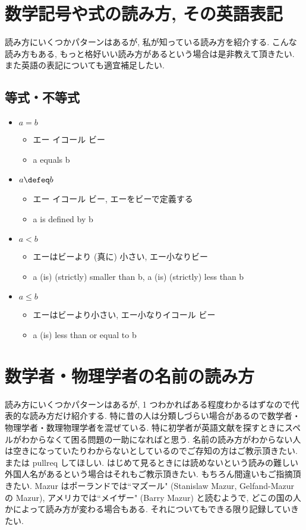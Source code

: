 \documentclass[openany, a4paper, oneside]{jsbook}
\begin{document}
\twocolumn
\chapter{数学記号や式の読み方, その英語表記}

読み方にいくつかパターンはあるが, 私が知っている読み方を紹介する.
こんな読み方もある, もっと格好いい読み方があるという場合は是非教えて頂きたい.
また英語の表記についても適宜補足したい.
\section{等式・不等式}

\begin{itemize}
\item $a=b$
\begin{itemize}
\item エー イコール ビー
\item a equals b
\end{itemize}
\item $a \defeq b$
\begin{itemize}
\item エー イコール ビー, エーをビーで定義する
\item a is defined by b
\end{itemize}
\item $a < b$
\begin{itemize}
\item エーはビーより (真に) 小さい, エー小なりビー
\item a (is) (strictly) smaller than b, a (is) (strictly) less than b
\end{itemize}
\item $a \leq b$
\begin{itemize}
\item エーはビーより小さい, エー小なりイコール ビー
\item a (is) less than or equal to b
\end{itemize}
\end{itemize}
\chapter{数学者・物理学者の名前の読み方}

読み方にいくつかパターンはあるが, 1 つわかればある程度わかるはずなので代表的な読み方だけ紹介する.
特に昔の人は分類しづらい場合があるので数学者・物理学者・数理物理学者を混ぜている.
特に初学者が英語文献を探すときにスペルがわからなくて困る問題の一助になればと思う.
名前の読み方がわからない人は空きになっていたりわからないとしているのでご存知の方はご教示頂きたい.
または pullreq してほしい.
はじめて見るときには読めないという読みの難しい外国人名があるという場合はそれもご教示頂きたい.
もちろん間違いもご指摘頂きたい.
Mazur はポーランドでは``マズール" (Stanislaw Mazur, Gelfand-Mazur の Mazur),
アメリカでは``メイザー" (Barry Mazur) と読むようで, どこの国の人かによって読み方が変わる場合もある.
それについてもできる限り記録していきたい.
\end{document}
